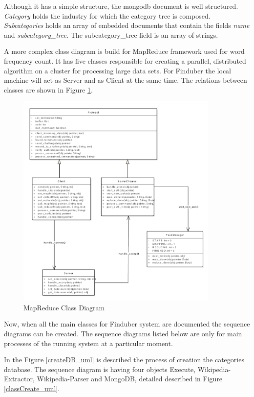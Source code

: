 Although it has a simple structure, the mongodb document is well structured. \textit{Category} holds the industry for which the category tree is composed. \textit{Subcategories} holds an array of embedded documents that contain the fields \textit{name} and \textit{subcategory\_tree}. The subcategory\_tree field is an array of strings. 

A more complex class diagram is build for MapReduce framework used for word frequency count. It has five classes responsible for creating a parallel, distributed algorithm on a cluster for processing large data sets. For Finduber the local machine will act as Server and as Client at the same time. The relations between classes are shown in Figure \ref{hadoop_uml}.

\begin{figure}[!ht]
\centering
\includegraphics[width=10cm]{hadoop}
\caption{MapReduce Class Diagram}\label{hadoop_uml}
\end{figure}

Now, when all the main classes for Finduber system are documented the sequence diagrams can be created. The sequence diagrams listed below are only for main processes of the running system at a particular moment. 

In the Figure \ref{createDB_uml} is described the process of creation the categories database. The sequence diagram is having four objects Execute, Wikipedia-Extractor, Wikipedia-Parser and MongoDB, detailed described in Figure \ref{classCreate_uml}.

